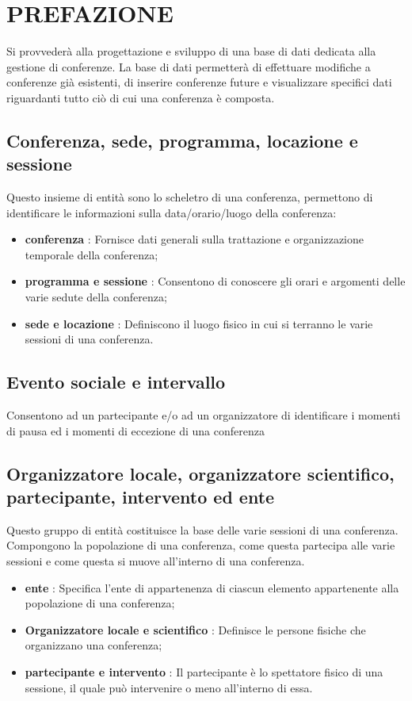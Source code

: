 \documentclass[a4page]{article}
\begin{document}
\section{PREFAZIONE}
Si provvederà alla progettazione e sviluppo di una base di dati dedicata alla gestione di conferenze. La base di dati permetterà di effettuare modifiche a conferenze già esistenti, di inserire conferenze future e visualizzare specifici dati riguardanti tutto ciò di cui una conferenza è composta.
\subsection{Conferenza, sede, programma, locazione e sessione}
Questo insieme di entità sono lo scheletro di una conferenza, permettono di identificare le informazioni sulla data/orario/luogo della conferenza:
\begin{itemize}
\item \textbf{conferenza} : Fornisce dati generali sulla trattazione e organizzazione temporale della conferenza;
\item \textbf{programma e sessione} : Consentono di conoscere gli orari e argomenti delle varie sedute della conferenza;
\item \textbf{sede e locazione} : Definiscono il luogo fisico in cui si terranno le varie sessioni di una conferenza.
\end{itemize}
\subsection{Evento sociale e intervallo}
Consentono ad un partecipante e/o ad un organizzatore di identificare i momenti di pausa ed i momenti di eccezione di una conferenza
\subsection{Organizzatore locale, organizzatore scientifico, partecipante, intervento ed ente}
Questo gruppo di entità costituisce la base delle varie sessioni di una conferenza. Compongono la popolazione di una conferenza, come questa partecipa alle varie sessioni e come questa si muove all'interno di una conferenza.
\begin{itemize}
\item \textbf{ente} : Specifica l'ente di appartenenza di ciascun elemento appartenente alla popolazione di una conferenza;
\item \textbf{Organizzatore locale e scientifico} : Definisce le persone fisiche che organizzano una conferenza;
\item \textbf{partecipante e intervento} : Il partecipante è lo spettatore fisico di una sessione, il quale può intervenire o meno all'interno di essa.
\end{itemize}
\end{document}
